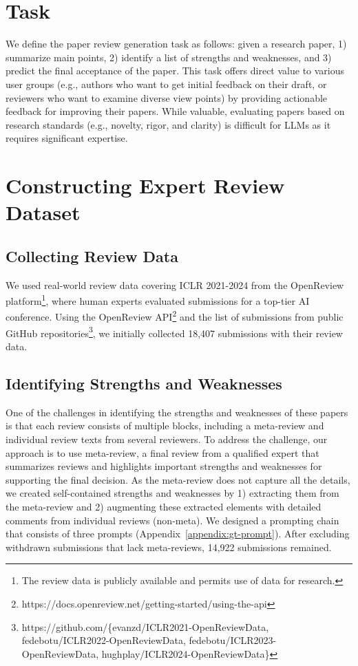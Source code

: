 \section{Task}

We define the paper review generation task as follows: given a research paper, 1) summarize main points, 2) identify a list of strengths and weaknesses, and 3) predict the final acceptance of the paper. This task offers direct value to various user groups (e.g., authors who want to get initial feedback on their draft, or reviewers who want to examine diverse view points) by providing actionable feedback for improving their papers. While valuable, evaluating papers based on research standards (e.g., novelty, rigor, and clarity) is difficult for LLMs as it requires significant expertise. %

\section {Constructing Expert Review Dataset}
\label{sec: pipeline}

\subsection {Collecting Review Data}

We used real-world review data covering ICLR 2021-2024 from the OpenReview platform\footnote{The review data is publicly available and permits use of data for research.}, where human experts evaluated submissions for a top-tier AI conference. Using the OpenReview API\footnote{https://docs.openreview.net/getting-started/using-the-api} and the list of submissions from public GitHub repositories\footnote{https://github.com/\{evanzd/ICLR2021-OpenReviewData, fedebotu/ICLR2022-OpenReviewData, fedebotu/ICLR2023-OpenReviewData, hughplay/ICLR2024-OpenReviewData\} }, we initially collected 18,407 submissions with their review data. 

\subsection {Identifying Strengths and Weaknesses}

One of the challenges in identifying the strengths and weaknesses of these papers is that each review consists of multiple blocks, including a meta-review and individual review texts from several reviewers. To address the challenge, our approach is to use meta-review, a final review from a qualified expert that summarizes reviews and highlights important strengths and weaknesses for supporting the final decision. As the meta-review does not capture all the details, we created self-contained strengths and weaknesses by 1) extracting them from the meta-review and 2) augmenting these extracted elements with detailed comments from individual reviews (non-meta). We designed a prompting chain that consists of three prompts (Appendix~\ref{appendix:gt-prompt}). After excluding withdrawn submissions that lack meta-reviews, 14,922 submissions remained.


